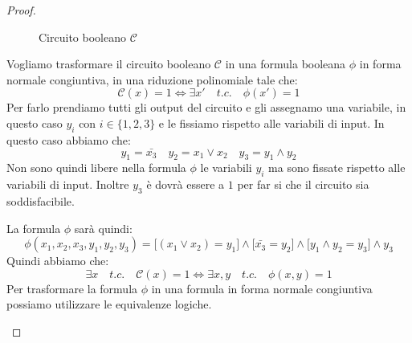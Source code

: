 \begin{proof}
\begin{enumerate}
\begin{figure}[H]
                \caption{Circuito booleano $\mathcal{C}$}
            \end{figure}
            Vogliamo trasformare il circuito booleano $\mathcal{C}$ in una
            formula booleana $\phi$ in forma normale congiuntiva, in una 
            riduzione polinomiale tale che:
            \[
                \mathcal{C}(x) = 1 \iff \exists x' \quad t.c. \quad \phi(x') = 1
            \]
            Per farlo prendiamo tutti gli output del circuito e gli assegnamo 
            una variabile, in questo caso $y_i$ con $i \in \{1, 2, 3\}$ e le fissiamo 
            rispetto alle variabili di input. In questo caso abbiamo che:
            \[
                y_1 = \bar{x_3} \quad y_2 = x_1 \lor x_2 \quad y_3 = y_1 \land y_2
            \]
            Non sono quindi libere nella formula $\phi$ le variabili $y_i$ ma 
            sono fissate rispetto alle variabili di input. Inoltre $y_3$ è dovrà 
            essere a $1$ per far si che il circuito sia soddisfacibile.

            La formula $\phi$ sarà quindi:
            \[
                \phi(x_1, x_2, x_3, y_1, y_2, y_3) 
                = \big[ (x_1 \lor x_2) = y_1 \big] \land 
                \big[ \bar{x_3} = y_2 \big] \land 
                \big[ y_1 \land y_2 = y_3 \big] \land
                y_3
            \]
            Quindi abbiamo che:
            \[
                \exists x \quad t.c. \quad \mathcal{C}(x) = 1
                \iff \exists x,y \quad t.c. \quad \phi(x, y) = 1
            \]
            Per trasformare la formula $\phi$ in una formula in forma normale
            congiuntiva possiamo utilizzare le equivalenze logiche.


\end{enumerate}
\end{proof}

